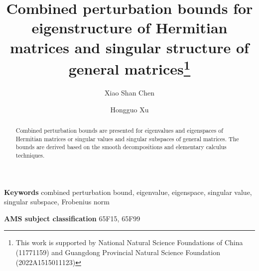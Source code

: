 \documentclass[11pt,a4paper]{article}
\title{Combined perturbation bounds for eigenstructure of Hermitian matrices and singular structure of general matrices\thanks{This work is supported by National Natural Science Foundations of China (11771159) and Guangdong Provincial Natural Science Foundation (2022A1515011123)}}
\author{Xiao Shan Chen\footnotemark[1]
\and Hongguo Xu\footnotemark[2]}
\numberwithin{equation}{section}
\begin{document}
\maketitle
\renewcommand{\thefootnote}{\fnsymbol{footnote}}

\renewcommand{\thefootnote}{\arabic{footnote}}


\begin{abstract}
Combined perturbation bounds are presented for eigenvalues and eigenspaces
of Hermitian matrices or singular values and singular subspaces of  general matrices.
The bounds are derived based on the smooth decompositions and elementary calculus techniques.
\end{abstract}

\noindent
{\bf Keywords}
combined perturbation bound, eigenvalue, eigenspace,  singular value, singular subspace, Frobenius norm

\noindent
{\bf AMS subject classification}
65F15, 65F99
\end{document}
